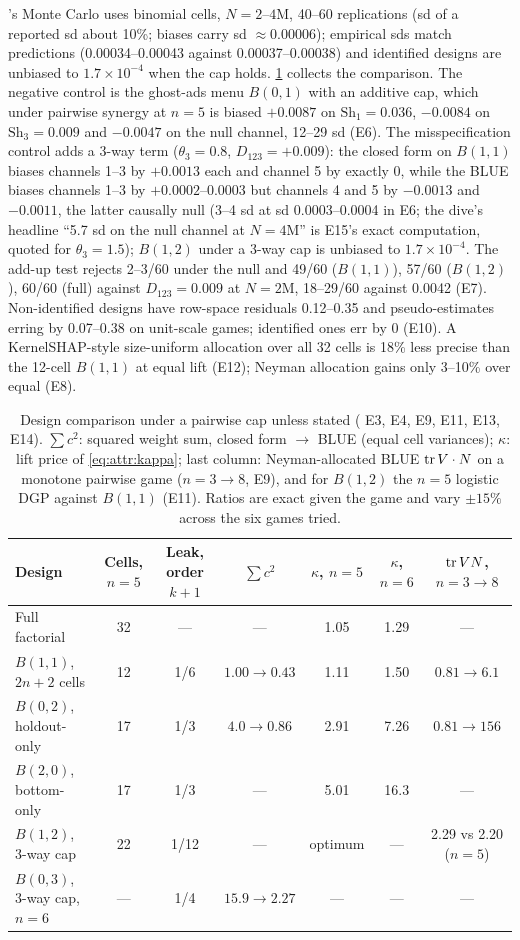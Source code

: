 's Monte Carlo uses binomial cells, $N = 2$--$4$M, 40--60 replications (sd of a reported sd about 10\%; biases carry sd $\approx 0.00006$); empirical sds match predictions (0.00034--0.00043 against 0.00037--0.00038) and identified designs are unbiased to $1.7\times10^{-4}$ when the cap holds. \cref{attr:tab:designs} collects the comparison. The negative control is the ghost-ads menu $B(0,1)$ with an additive cap, which under pairwise synergy at $n = 5$ is biased $+0.0087$ on $\mathrm{Sh}_1 = 0.036$, $-0.0084$ on $\mathrm{Sh}_3 = 0.009$ and $-0.0047$ on the null channel, 12--29 sd (E6). The misspecification control adds a 3-way term ($\theta_3 = 0.8$, $D_{123} = +0.009$): the closed form on $B(1,1)$ biases channels 1--3 by $+0.0013$ each and channel 5 by exactly 0, while the BLUE biases channels 1--3 by $+0.0002$--$0.0003$ but channels 4 and 5 by $-0.0013$ and $-0.0011$, the latter causally null (3--4 sd at sd 0.0003--0.0004 in E6; the dive's headline ``5.7 sd on the null channel at $N = 4$M'' is E15's exact computation, quoted for $\theta_3 = 1.5$); $B(1,2)$ under a 3-way cap is unbiased to $1.7\times10^{-4}$. The add-up test rejects 2--3/60 under the null and 49/60 ($B(1,1)$), 57/60 ($B(1,2)$), 60/60 (full) against $D_{123} = 0.009$ at $N = 2$M, 18--29/60 against 0.0042 (E7). Non-identified designs have row-space residuals 0.12--0.35 and pseudo-estimates erring by 0.07--0.38 on unit-scale games; identified ones err by 0 (E10). A KernelSHAP-style size-uniform allocation over all 32 cells is 18\% less precise than the 12-cell $B(1,1)$ at equal lift (E12); Neyman allocation gains only 3--10\% over equal (E8).

\begin{table}[htbp]
\centering\footnotesize
\caption{Design comparison under a pairwise cap unless stated ( E3, E4, E9, E11, E13, E14). $\sum c^2$: squared weight sum, closed form $\to$ BLUE (equal cell variances); $\kappa$: lift price of \cref{eq:attr:kappa}; last column: Neyman-allocated BLUE $\operatorname{tr} V \cdot N$ on a monotone pairwise game ($n = 3 \to 8$, E9), and for $B(1,2)$ the $n = 5$ logistic DGP against $B(1,1)$ (E11). Ratios are exact given the game and vary $\pm15\%$ across the six games tried.}
\label{attr:tab:designs}
\begin{tabular}{lcccccc}
\toprule
Design & Cells, $n{=}5$ & Leak, order $k{+}1$ & $\sum c^2$ & $\kappa$, $n{=}5$ & $\kappa$, $n{=}6$ & $\operatorname{tr} V N$, $n{=}3 \to 8$ \\
\midrule
Full factorial & 32 & --- & --- & 1.05 & 1.29 & --- \\
$B(1,1)$, $2n+2$ cells & 12 & 1/6 & $1.00 \to 0.43$ & 1.11 & 1.50 & $0.81 \to 6.1$ \\
$B(0,2)$, holdout-only & 17 & 1/3 & $4.0 \to 0.86$ & 2.91 & 7.26 & $0.81 \to 156$ \\
$B(2,0)$, bottom-only & 17 & 1/3 & --- & 5.01 & 16.3 & --- \\
$B(1,2)$, 3-way cap & 22 & 1/12 & --- & optimum & --- & 2.29 vs 2.20 ($n{=}5$) \\
$B(0,3)$, 3-way cap, $n{=}6$ & --- & 1/4 & $15.9 \to 2.27$ & --- & --- & --- \\
\bottomrule
\end{tabular}
\end{table}

